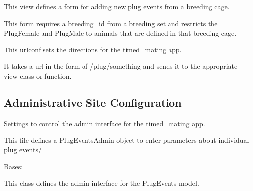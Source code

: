 \documentclass[letterpaper,10pt,english]{sphinxmanual}
\begin{document}

\begin{fulllineitems}
\label{api:mousedb.timed_mating.views.breeding_plugevent}
This view defines a form for adding new plug events from a breeding cage.

This form requires a breeding\_id from a breeding set and restricts the PlugFemale and PlugMale to animals that are defined in that breeding cage.

\end{fulllineitems}

\label{api:module-mousedb.timed_mating.urls}
This urlconf sets the directions for the timed\_mating app.

It takes a url in the form of /plug/something and sends it to the appropriate view class or function.


\subsection{Administrative Site Configuration}
\label{api:id11}\label{api:module-mousedb.timed_mating.admin}
Settings to control the admin interface for the timed\_mating app.

This file defines a PlugEventsAdmin object to enter parameters about individual plug events/


\begin{fulllineitems}
\label{api:mousedb.timed_mating.admin.PlugEventsAdmin}
Bases: 

This class defines the admin interface for the PlugEvents model.


\begin{fulllineitems}
\label{api:mousedb.timed_mating.admin.PlugEventsAdmin.media}
\end{fulllineitems}


\end{fulllineitems}
\end{document}
